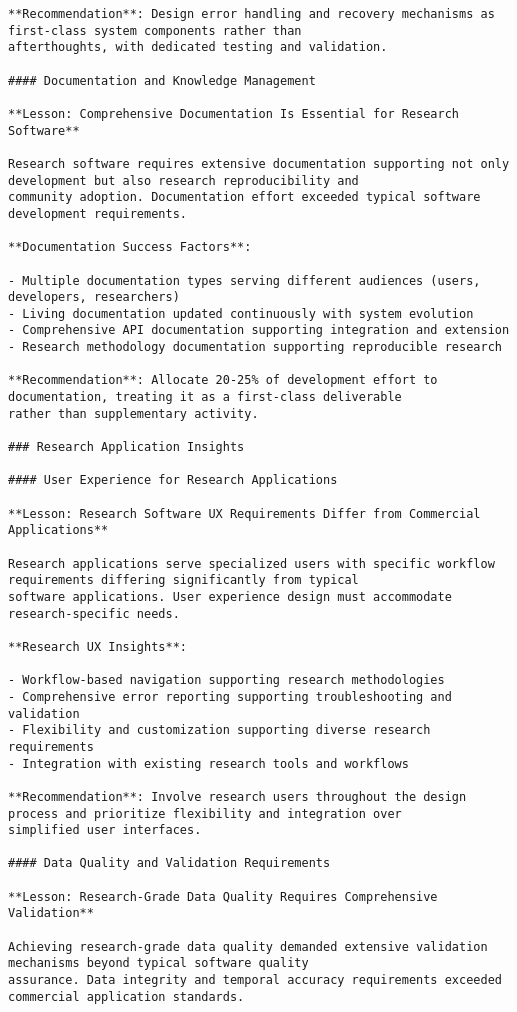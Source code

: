 \documentclass[11pt,a4paper]{report}
\begin{document}
\begin{verbatim}
**Recommendation**: Design error handling and recovery mechanisms as first-class system components rather than
afterthoughts, with dedicated testing and validation.

#### Documentation and Knowledge Management

**Lesson: Comprehensive Documentation Is Essential for Research Software**

Research software requires extensive documentation supporting not only development but also research reproducibility and
community adoption. Documentation effort exceeded typical software development requirements.

**Documentation Success Factors**:

- Multiple documentation types serving different audiences (users, developers, researchers)
- Living documentation updated continuously with system evolution
- Comprehensive API documentation supporting integration and extension
- Research methodology documentation supporting reproducible research

**Recommendation**: Allocate 20-25% of development effort to documentation, treating it as a first-class deliverable
rather than supplementary activity.

### Research Application Insights

#### User Experience for Research Applications

**Lesson: Research Software UX Requirements Differ from Commercial Applications**

Research applications serve specialized users with specific workflow requirements differing significantly from typical
software applications. User experience design must accommodate research-specific needs.

**Research UX Insights**:

- Workflow-based navigation supporting research methodologies
- Comprehensive error reporting supporting troubleshooting and validation
- Flexibility and customization supporting diverse research requirements
- Integration with existing research tools and workflows

**Recommendation**: Involve research users throughout the design process and prioritize flexibility and integration over
simplified user interfaces.

#### Data Quality and Validation Requirements

**Lesson: Research-Grade Data Quality Requires Comprehensive Validation**

Achieving research-grade data quality demanded extensive validation mechanisms beyond typical software quality
assurance. Data integrity and temporal accuracy requirements exceeded commercial application standards.


\end{verbatim}
\end{document}
